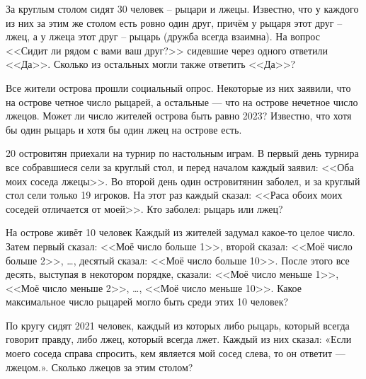 \documentclass{article}
\begin{document}
\begin{enumerate_boxed}
        \item За круглым столом сидят 30 человек – рыцари и лжецы.
        Известно, что у каждого из них за этим же столом есть ровно один друг, причём у рыцаря этот друг – лжец, а у лжеца этот друг – рыцарь (дружба всегда взаимна).
        На вопрос <<Сидит ли рядом с вами ваш друг?>> сидевшие через одного ответили <<Да>>.
        Сколько из остальных могли также ответить <<Да>>?

        \item Все жители острова прошли социальный опрос.
        Некоторые из них заявили, что на острове четное число рыцарей, а остальные — что на острове нечетное число лжецов.
        Может ли число жителей острова быть равно 2023?
        Известно, что хотя бы один рыцарь и хотя бы один лжец на острове есть.

        \item 20 островитян приехали на турнир по настольным играм.
        В первый день турнира все собравшиеся сели за круглый стол, и перед началом каждый заявил: <<Оба моих соседа лжецы>>.
        Во второй день один островитянин заболел, и за круглый стол сели только 19 игроков.
        На этот раз каждый сказал: <<Раса обоих моих соседей отличается от моей>>.
        Кто заболел: рыцарь или лжец?

        \item На острове живёт 10 человек Каждый из жителей задумал какое-то целое число.
        Затем первый сказал: <<Моё число больше 1>>, второй сказал: <<Моё число больше 2>>, \ldots, десятый сказал: <<Моё число больше 10>>.
        После этого все десять, выступая в некотором порядке, сказали: <<Моё число меньше 1>>, <<Моё число меньше 2>>, \ldots, <<Моё число меньше 10>>.
        Какое максимальное число рыцарей могло быть среди этих 10 человек?

        \item По кругу сидят 2021 человек, каждый из которых либо рыцарь, который всегда говорит правду, либо лжец, который всегда лжет.
        Каждый из них сказал: «Если моего соседа справа спросить, кем является мой сосед слева, то он ответит — лжецом.». Сколько лжецов за этим столом?

    \end{enumerate_boxed}
\end{document}
